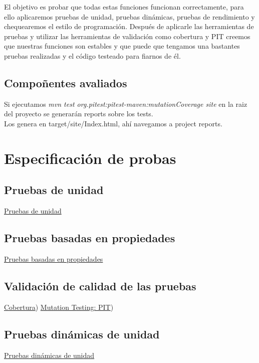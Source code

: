 \documentclass[DIV=calc,paper=a4,fontsize=11pt,onecolumn]{scrartcl} %
\begin{document}
	El objetivo es probar que todas estas funciones funcionan correctamente, para ello aplicaremos pruebas de unidad, pruebas dinámicas, pruebas de rendimiento y chequearemos el estilo de programación.
	Después de aplicarle las herramientas de pruebas y utilizar las herramientas de validación como cobertura y PIT creemos que nuestras funciones son estables y que puede que tengamos una bastantes pruebas realizadas y el código testeado para fiarnos de él. 

\subsection{Compoñentes avaliados}

Si ejecutamos \textit{mvn test org.pitest:pitest-maven:mutationCoverage site} en la raiz del proyecto se generarán reports sobre los tests. \\

Los genera en target/site/Index.html, ahí navegamos a project reports. \\

\section{Especificación de probas}

\subsection{Pruebas de unidad}
\href{Informes/documentoUnidad.txt}{Pruebas de unidad} \\

\subsection{Pruebas basadas en propiedades}
\href{Informes/documentoPropiedades.txt}{Pruebas basadas en propiedades} \\

\subsection{Validación de calidad de las pruebas}
\href{http://cobertura.sourceforge.net/}{Cobertura})
\href{http://pitest.org/}{Mutation Testing: PIT})

\subsection{Pruebas dinámicas de unidad}
\href{Informes/documentoDinamicasUnidad.txt}{Pruebas dinámicas de unidad} \\
\end{document}
